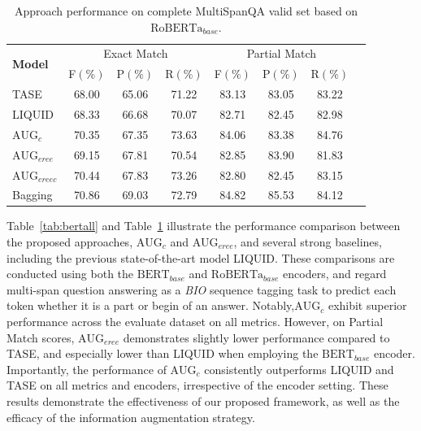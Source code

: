 \documentclass[a4paper,fleqn,twocolumn]{cas-dc}
\newcommand{\1}[1]{\mathds{1}\left[#1\right]}
\begin{document}
	\begin{table}[width=\textwidth,cols=8,pos=h]  
		\caption{Approach performance on complete MultiSpanQA valid set based on $\text{RoBERTa}_{base}$.} 
		\label{tab:robertaall}
		\begin{tabular*}{\textwidth}{@{\extracolsep{\fill}}lccccccc}
			\toprule
			\multirow{2}{*}{\textbf{Model}} & \multicolumn{3}{c}{Exact Match} & \multicolumn{3}{c}{Partial Match}  \\
			\cline{2-7} 
			\addlinespace
			& F\((\%)\) & P\((\%)\) & R\((\%)\) & F\((\%)\) & P\((\%)\) & R\((\%)\) \\
			\midrule
			TASE & 68.00 & 65.06 & 71.22 & 83.13 & 83.05 & 83.22 \\ 
			LIQUID & 68.33 & 66.68 & 70.07 & 82.71 & 82.45 & 82.98 \\
			$\text{AUG}_{c}$ & 70.35 & 67.35 & 73.63 & 84.06 & 83.38 & 84.76 \\
			$\text{AUG}_{eree}$ & 69.15 & 67.81 & 70.54 & 82.85 & 83.90 & 81.83 \\
			$\text{AUG}_{ereec}$ & 70.44 & 67.83 & 73.26 & 82.80 & 82.45 & 83.15 \\
			Bagging & 70.86 & 69.03 & 72.79 & 84.82 & 85.53 & 84.12 \\
			\bottomrule
		\end{tabular*}      
	\end{table}
	Table~\ref{tab:bertall} and Table~\ref{tab:robertaall} illustrate the performance comparison between the proposed approaches, $\text{AUG}_{c}$ and $\text{AUG}_{eree}$, and several strong baselines, including the previous state-of-the-art model LIQUID. These comparisons are conducted using both the $\text{BERT}_{base}$ and $\text{RoBERTa}_{base}$ encoders, and regard multi-span question answering as a \textit{BIO} sequence tagging task to predict each token whether it is a part or begin of an answer. 
	Notably,$\text{AUG}_{c}$ exhibit superior performance across the evaluate dataset on all metrics. However, on Partial Match scores, $\text{AUG}_{eree}$ demonstrates slightly lower performance compared to TASE, and especially lower than LIQUID when employing the $\text{BERT}_{base}$ encoder.
	Importantly, the performance of $\text{AUG}_{c}$ consistently outperforms LIQUID and TASE on all metrics and encoders, irrespective of the encoder setting.
	These results demonstrate the effectiveness of our proposed framework, as well as the efficacy of the information augmentation strategy.
	 
\end{document}
